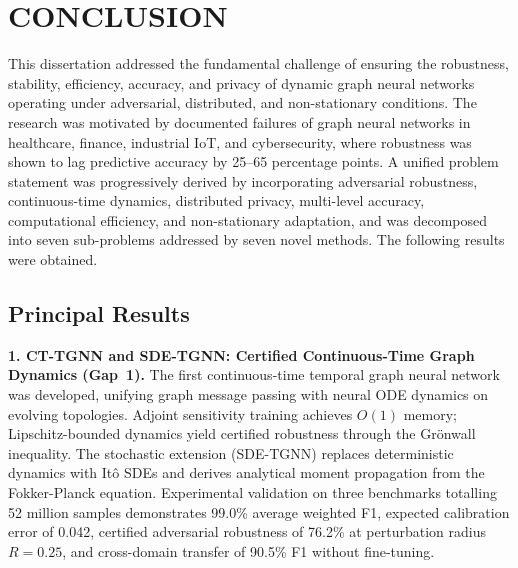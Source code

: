 
\chapter*{CONCLUSION}

This dissertation addressed the fundamental challenge of ensuring the robustness, stability, efficiency, accuracy, and privacy of dynamic graph neural networks operating under adversarial, distributed, and non-stationary conditions. The research was motivated by documented failures of graph neural networks in healthcare, finance, industrial IoT, and cybersecurity, where robustness was shown to lag predictive accuracy by 25--65 percentage points. A unified problem statement was progressively derived by incorporating adversarial robustness, continuous-time dynamics, distributed privacy, multi-level accuracy, computational efficiency, and non-stationary adaptation, and was decomposed into seven sub-problems addressed by seven novel methods. The following results were obtained.


\section*{Principal Results}

\noindent\textbf{1. CT-TGNN and SDE-TGNN: Certified Continuous-Time Graph Dynamics (Gap~1).}
The first continuous-time temporal graph neural network was developed, unifying graph message passing with neural ODE dynamics on evolving topologies. Adjoint sensitivity training achieves $O(1)$ memory; Lipschitz-bounded dynamics yield certified robustness through the Gr\"{o}nwall inequality. The stochastic extension (SDE-TGNN) replaces deterministic dynamics with It\^{o} SDEs and derives analytical moment propagation from the Fokker-Planck equation. Experimental validation on three benchmarks totalling 52 million samples demonstrates 99.0\% average weighted F1, expected calibration error of 0.042, certified adversarial robustness of 76.2\% at perturbation radius $R=0.25$, and cross-domain transfer of 90.5\% F1 without fine-tuning.

